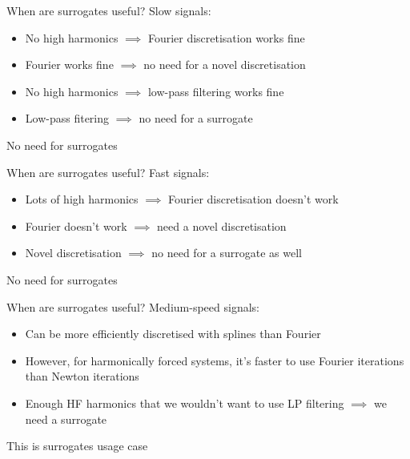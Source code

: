 \documentclass[presentation]{beamer}
\begin{document}
\begin{frame}[label={sec:orgb83692c}]{When are surrogates useful?}
Slow signals:

\vfill
\begin{itemize}
\item No high harmonics \(\implies\) Fourier discretisation works fine
\item Fourier works fine \(\implies\) no need for a novel discretisation
\item No high harmonics \(\implies\) low-pass filtering works fine
\item Low-pass fitering \(\implies\) no need for a surrogate
\end{itemize}

\vfill
No need for surrogates
\end{frame}
\begin{frame}[label={sec:org3e6f789}]{When are surrogates useful?}
Fast signals:
\vfill
\begin{itemize}
\item Lots of high harmonics \(\implies\) Fourier discretisation doesn't work
\item Fourier doesn't work \(\implies\) need a novel discretisation
\item Novel discretisation \(\implies\) no need for a surrogate as well
\end{itemize}

\vfill
No need for surrogates
\end{frame}

\begin{frame}[label={sec:org9f93d54}]{When are surrogates useful?}
Medium-speed signals:
\vfill
\begin{itemize}
\item Can be more efficiently discretised with splines than Fourier
\item However, for harmonically forced systems, it's faster to use Fourier iterations than Newton iterations
\item Enough HF harmonics that we wouldn't want to use LP filtering \(\implies\) we need a surrogate
\end{itemize}

\vfill
This is surrogates usage case
\end{frame}
\end{document}

